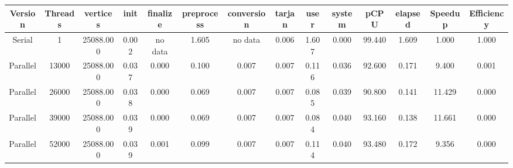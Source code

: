 \begin{tabular}{|c|c|c|c|c|c|c|c|c|c|c|c|c|c|}
\toprule
 Version &  Threads &  vertices &  init & finalize &  preprocess & conversion &  tarjan &  user &  system &   pCPU &  elapsed &  Speedup &  Efficiency \\
\midrule
  Serial &        1 & 25088.000 & 0.002 &  no data &       1.605 &    no data &   0.006 & 1.607 &   0.000 & 99.440 &    1.609 &    1.000 &       1.000 \\
Parallel &    13000 & 25088.000 & 0.037 &    0.000 &       0.100 &      0.007 &   0.007 & 0.116 &   0.036 & 92.600 &    0.171 &    9.400 &       0.001 \\
Parallel &    26000 & 25088.000 & 0.038 &    0.000 &       0.069 &      0.007 &   0.007 & 0.085 &   0.039 & 90.800 &    0.141 &   11.429 &       0.000 \\
Parallel &    39000 & 25088.000 & 0.039 &    0.000 &       0.069 &      0.007 &   0.007 & 0.084 &   0.040 & 93.160 &    0.138 &   11.661 &       0.000 \\
Parallel &    52000 & 25088.000 & 0.039 &    0.001 &       0.099 &      0.007 &   0.007 & 0.114 &   0.040 & 93.480 &    0.172 &    9.356 &       0.000 \\
\bottomrule
\end{tabular}
